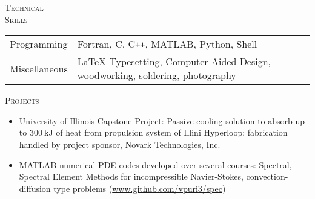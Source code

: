 \documentclass[10pt]{article}
\begin{document}
\vspace{-1.5em}
\begin{multicols}{2}
\textsc{\small Technical \\ Skills}
\columnbreak

\begin {table}[H]
\begin{tabular}{l l }
\hspace{-0.5em}Programming   & \hspace{-0.0em}Fortran, C, C\texttt{++}, MATLAB, Python, Shell\\
\hspace{-0.5em}Miscellaneous & \hspace{-0.0em}\LaTeX{} Typesetting, Computer Aided Design, woodworking, soldering, photography \\
\end{tabular}	
\end{table}

\vspace{-1.0em}
\end{multicols}
\vspace{-1.5em}
\begin{multicols}{2}
\textsc{\small Projects}
\columnbreak

\vspace{-2.0em}
\begin{itemize}[label=-]
    \setlength{\itemindent}{-1.5em}
    \setlength\itemsep{-0.5\itemsep}
    \item University of Illinois Capstone Project: Passive cooling solution to absorb up to $\SI{300}{\kilo \joule}$ of heat from propulsion system of Illini Hyperloop; fabrication handled by project sponsor, Novark Technologies, Inc.
    \item MATLAB numerical PDE codes developed over several courses: Spectral, Spectral Element Methods for incompressible Navier-Stokes, convection-diffusion type problems (\url{www.github.com/vpuri3/spec})
\end{itemize}
\vspace{-2.0em}

\end{multicols}
\vspace{-1.5em}
\vfill
\end{document}

